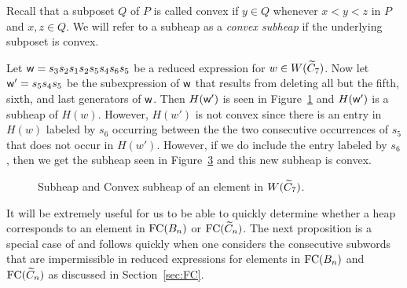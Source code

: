 Recall that a subposet $Q$ of $P$ is called convex if $y \in Q$ whenever $x< y<z$ in $P$ and $x,z \in Q$. We will refer to a subheap as a \emph{convex subheap} if the underlying subposet is convex.

\begin{example}
Let $\mathsf{w}=s_3s_2s_1s_2s_5s_4s_6s_5$ be a reduced expression for $w \in W(\widetilde{C}_7)$. Now let $\mathsf{w}'=s_5s_4s_5$ be the subexpression of $\mathsf{w}$ that results from deleting all but the fifth, sixth, and last generators of $\mathsf{w}$. Then $H(\mathsf{w}')$ is seen in Figure~\ref{fig:subheap} and $H(\mathsf{w}')$ is a subheap of $H(w)$. However, $H(w')$ is not convex since there is an entry in $H(w)$ labeled by $s_6$ occurring between the the two consecutive occurrences of $s_5$ that does not occur in $H(w')$. However, if we do include the entry labeled by $s_6$, then we get the subheap seen in Figure~\ref{fig:convex} and this new subheap is convex.

\begin{figure}[h]
\centering
\begin{subfigure}[b]{0.3\textwidth}	
\centering
{}
\caption{}\label{fig:subheap}
\end{subfigure}
\begin{subfigure}[b]{0.3\textwidth}	
\centering
{}
\caption{}\label{fig:convex}
\end{subfigure}
\caption{Subheap and Convex subheap of an element in $W(\widetilde{C}_7)$.}	
\end{figure}
\end{example}


It will be extremely useful for us to be able to quickly determine whether a heap corresponds to an element in $\mathrm{FC}(B_n)$ or $\mathrm{FC}(\widetilde{C}_n)$. The next proposition is a special case of \cite[Proposition 3.3]{Stembridge1996} and follows quickly when one considers the consecutive subwords that are impermissible in reduced expressions for elements in $\mathrm{FC}(B_n)$ and $\mathrm{FC}(\widetilde{C}_n)$ as discussed in Section~\ref{sec:FC}.

